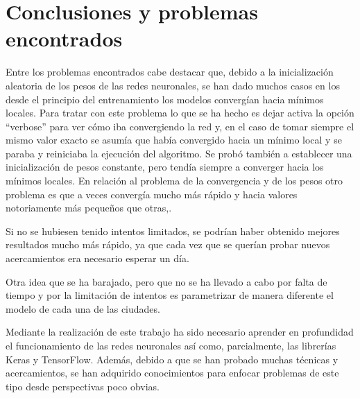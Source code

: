 \documentclass[acmtog, screen]{acmart}
\begin{document}
\section{Conclusiones y problemas encontrados}

Entre los problemas encontrados cabe destacar que, debido a la inicialización aleatoria de los pesos de las redes neuronales, se han dado muchos casos en los desde el principio del entrenamiento los modelos convergían hacia mínimos locales. Para tratar con este problema lo que se ha hecho es dejar activa la opción ``verbose'' para ver cómo iba convergiendo la red y, en el caso de tomar siempre el mismo valor exacto se asumía que había convergido hacia un mínimo local y se paraba y reiniciaba la ejecución del algoritmo. Se probó también a establecer una inicialización de pesos constante, pero tendía siempre a converger hacia los mínimos locales. En relación al problema de la convergencia y de los pesos otro problema es que a veces convergía mucho más rápido y hacia valores notoriamente más pequeños que otras,. 

Si no se hubiesen tenido intentos limitados, se podrían haber obtenido mejores resultados mucho más rápido, ya que cada vez que se querían probar nuevos acercamientos era necesario esperar un día.

Otra idea que se ha barajado, pero que no se ha llevado a cabo por falta de tiempo y por la limitación de intentos es parametrizar de manera diferente el modelo de cada una de las ciudades.

Mediante la realización de este trabajo ha sido necesario aprender en profundidad el funcionamiento de las redes neuronales así como, parcialmente, las librerías Keras y TensorFlow. Además, debido a que se han probado muchas técnicas y acercamientos, se han adquirido conocimientos para enfocar problemas de este tipo desde perspectivas poco obvias.
\end{document}
